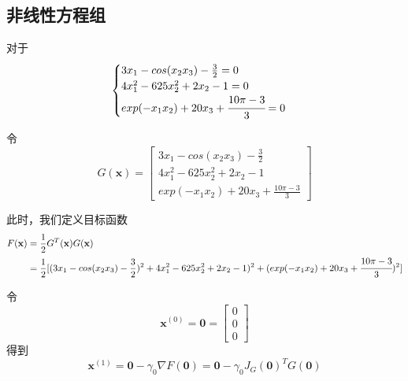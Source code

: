 \documentclass[12pt,a4paper]{article}
\begin{document}
\subsection{非线性方程组}
对于
\begin{equation}
\begin{cases}
	3x_1-cos(x_2x_3)-\frac{3}{2}=0\\
	4x_1^2-625x_2^2+2x_2-1=0\\
	exp(-x_1x_2)+20x_3+\cfrac{10\pi-3}{3}=0
\end{cases}
\end{equation}

令
\begin{equation}
	G(\mathbf x)=\left[
\begin{array}{c}
          3 x_{1}-cos \left(x_{2} x_{3}\right)-\frac{3}{2}\\
          4 x_{1}^{2}-625 x_{2}^{2}+2 x_{2}-1 \\
         exp(-x_{1} x_{2})+20 x_{3}+\frac{10 \pi-3}{3}
\end{array}\right]
\end{equation}

此时，我们定义目标函数
\begin{equation}
	\begin{aligned}
	F(\mathbf x)&=\frac{1}{2} G^{T}(\mathbf x)G(\mathbf x)\\
		&=\frac{1}{2} [(3x_1-cos(x_2x_3)-\frac{3}{2})^2+4x_1^2-625x_2^2+2x_2-1)^2+(exp(-x_1x_2)+20x_3+\cfrac{10\pi-3}{3})^2]
	\end{aligned}
\end{equation}

令
$$\mathbf{x}^{(0)}=\mathbf{0}=\left[\begin{array}{l}{0} \\ {0} \\ {0}\end{array}\right]$$
得到
\begin{equation}
	\mathbf x^{(1)}=\mathbf 0-\gamma_0 \nabla F(\mathbf 0)=\mathbf 0-\gamma_{0} J_G(\mathbf 0)^{T} G(\mathbf 0)
\end{equation}
\end{document}
